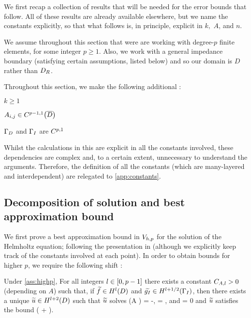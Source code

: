 We first recap a collection of results that will be needed for the error bounds that follow. All of these results are already available elsewhere, but we name the constants explicitly, so that what follows is, in principle, explicit in $k,$ $A$, and $n.$

We assume throughout this section that were are working with degree-$p$ finite elements, for some integer $p \geq 1.$ Also, we work with a general impedance boundary (satisfying certain assumptions, listed below) and so our domain is $D$ rather than $D_{R}$.

Throughout this section, we make the following additional :
\label{ass:highp}
\bit
\item $k \geq 1$
\item $\Aij \in \CpmooDclos$
\item $\Gamma_{D}$ and $\Gamma_{I}$ are $C^{p,1}$
  \eit
\eas

Whilst the calculations in this  are explicit in all the constants involved, these dependencies are complex and, to a certain extent, unnecessary to understand the arguments. Therefore, the definition of all the constants (which are many-layered and interdependent) are relegated to \cref{app:constants}.

\subsection{Decomposition of solution and best approximation bound}

We first prove a best approximation bound in $V_{h,p}$ for the solution of the Helmholtz equation; following the presentation in \cite{ChNi:18a} (although we explicitly keep track of the constants involved at each point). In order to obtain bounds for higher $p$, we require the following shift :

\label{thm:shift}
Under \cref{ass:highp}, For all integers $l \in \mleft[0,p-1\mright]$ there exists a constant $C_{A,l}>0$ (depending on $A$) such that, if $\ftilde \in \HlD$ and $\gItilde \in \HlphGI$, then there exists a unique $\utilde \in \HlptD$ such that $\widetilde{u}$ solves
\beqs
\grad \cdot \mleft(A \grad \utilde\mright) = -\ftilde,
\eeqs
\beqs
\dn \utilde = \gItilde,
\eeqs
and
\beqs
\trD \utilde = 0
\eeqs
and $\widetilde{u}$ satisfies the bound
\beq\label{eq:shift}
\NHlptD{\utilde} \leq \CAl \mleft(\NHlD{\ftilde} + \NHlphGI{\gItilde}\mright).
\eeq
\enth

